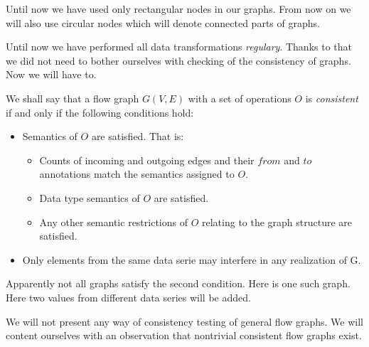 \begin{rem}
  Until now we have used only rectangular nodes in our graphs. From now on we will also use circular nodes which will denote connected parts of graphs.
\end{rem}


Until now we have performed all data transformations \emph{regulary}. Thanks to that we did not need to bother ourselves with checking of the consistency of graphs. Now we will have to.

\begin{define}
  We shall say that a flow graph $G(V,E)$ with a set of operations $O$ is \emph{consistent} if and only if the following conditions hold:
  \begin{itemize}
    \item Semantics of $O$ are satisfied. That is:
      \begin{itemize}
        \item Counts of incoming and outgoing edges and their $from$ and $to$ annotations match the semantics assigned to $O$.
        \item Data type semantics of $O$ are satisfied.
        \item Any other semantic restrictions of $O$ relating to the graph structure are satisfied. 
      \end{itemize}
    \item Only elements from the same data serie may interfere in any realization of G.
  \end{itemize}
\end{define}


Apparently not all graphs satisfy the second condition. Here is one such graph. Here two values from different data series will be added.

\FloatBarrier


\FloatBarrier

We will not present any way of consistency testing of general flow graphs. We will content ourselves with an observation that nontrivial consistent flow graphs exist.

